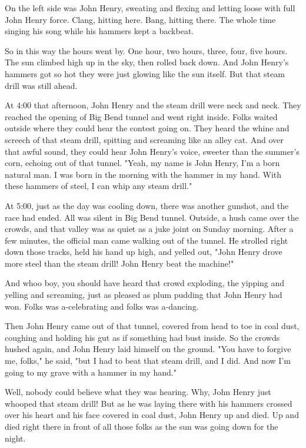 On the left side was John Henry, sweating and flexing and letting loose with full John Henry force. Clang, hitting here. Bang, hitting there. The whole time singing his song while his hammers kept a backbeat.

So in this way the hours went by. One hour, two hours, three, four, five hours. The sun climbed high up in the sky, then rolled back down. And John Henry's hammers got so hot they were just glowing like the sun itself. But that steam drill was still ahead.

At 4:00 that afternoon, John Henry and the steam drill were neck and neck. They reached the opening of Big Bend tunnel and went right inside. Folks waited outside where they could hear the contest going on. They heard the whine and screech of that steam drill, spitting and screaming like an alley cat. And over that awful sound, they could hear John Henry's voice, sweeter than the summer's corn, echoing out of that tunnel. "Yeah, my name is John Henry, I'm a born natural man. I was born in the morning with the hammer in my hand. With these hammers of steel, I can whip any steam drill."

At 5:00, just as the day was cooling down, there was another gunshot, and the race had ended. All was silent in Big Bend tunnel. Outside, a hush came over the crowds, and that valley was as quiet as a juke joint on Sunday morning. After a few minutes, the official man came walking out of the tunnel. He strolled right down those tracks, held his hand up high, and yelled out, "John Henry drove more steel than the steam drill! John Henry beat the machine!"

And whoo boy, you should have heard that crowd exploding, the yipping and yelling and screaming, just as pleased as plum pudding that John Henry had won. Folks was a-celebrating and folks was a-dancing.

Then John Henry came out of that tunnel, covered from head to toe in coal dust, coughing and holding his gut as if something had bust inside. So the crowds hushed again, and John Henry laid himself on the ground. "You have to forgive me, folks," he said, "but I had to beat that steam drill, and I did. And now I'm going to my grave with a hammer in my hand."

Well, nobody could believe what they was hearing. Why, John Henry just whooped that steam drill! But as he was laying there with his hammers crossed over his heart and his face covered in coal dust, John Henry up and died. Up and died right there in front of all those folks as the sun was going down for the night.

